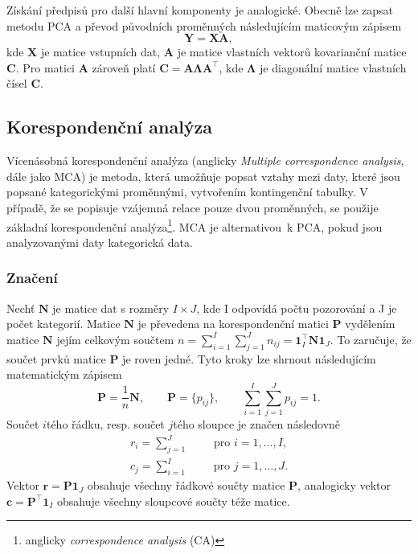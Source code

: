 Získání předpisů pro další hlavní komponenty je analogické. Obecně lze zapsat metodu PCA a převod původních proměnných následujícím maticovým zápisem
\begin{equation}
    \mathbf{Y} = \mathbf{XA}, 
\end{equation}
kde $\mathbf{X}$ je matice vstupních dat, $\mathbf{A}$ je matice vlastních vektorů kovarianční matice $\mathbf{C}$. Pro matici $\mathbf{A}$ zároveň platí $\mathbf{C} =  \mathbf{A} \mathbf{\Lambda} \mathbf{A}^\top$, kde $\mathbf{\Lambda}$ je diagonální matice vlastních čísel $\mathbf{C}$.\cite{bib:PCA2}  %

\subsection{Korespondenční analýza}

Vícenásobná korespondenční analýza (anglicky \emph{Multiple correspondence analysis}, dále jako MCA) je metoda, která umožňuje popsat vztahy mezi daty, které jsou popsané kategorickými proměnnými, vytvořením kontingenční tabulky. V případě, že se popisuje vzájemná relace pouze dvou proměnných, se použije základní korespondenční analýza\footnote{anglicky \emph{correspondence analysis} (CA)}. MCA je alternativou~k PCA, pokud jsou analyzovanými daty kategorická data. \cite{bib:MCA1}

\subsubsection{Značení}
Nechť $\mathbf{N}$ je matice dat s rozměry $I\times J$, kde I odpovídá počtu pozorování a J je počet kategorií. %
Matice $\mathbf{N}$ je převedena na korespondenční matici $\mathbf{P}$ vydělením matice $\mathbf{N}$ jejím celkovým součtem $n = \sum_{i=1}^{I} \sum_{j=1}^{J} n_{ij}=\mathbf{1}^\top_I \mathbf{N}\mathbf{1}_J$. To zaručuje, že součet prvků matice $\mathbf{P}$ je roven jedné. Tyto kroky lze shrnout následujícím matematickým zápisem
\begin{equation}
    \mathbf{P} = \frac{1}{n}\mathbf{N}, \qquad \mathbf{P} = \{p_{ij}\},  \qquad  \sum_{i=1}^{I} \sum_{j=1}^{J} p_{ij} = 1.
\end{equation}
Součet $i$tého řádku, resp. součet $j$tého sloupce je značen následovně
\begin{align*}
    r_i = \sum_{j=1}^{J} \qquad \mbox{ pro } i=1,\ldots,I, \\
    c_j = \sum_{i=1}^{I} \qquad \mbox{ pro } j=1,\ldots,J.
\end{align*}
Vektor $\bm{r} = \mathbf{P} \mathbf{1}_J $ obsahuje všechny řádkové součty matice $\mathbf{P}$, analogicky vektor $\bm{c} = \mathbf{P}^\top \mathbf{1}_I $ obsahuje všechny sloupcové součty téže matice.

